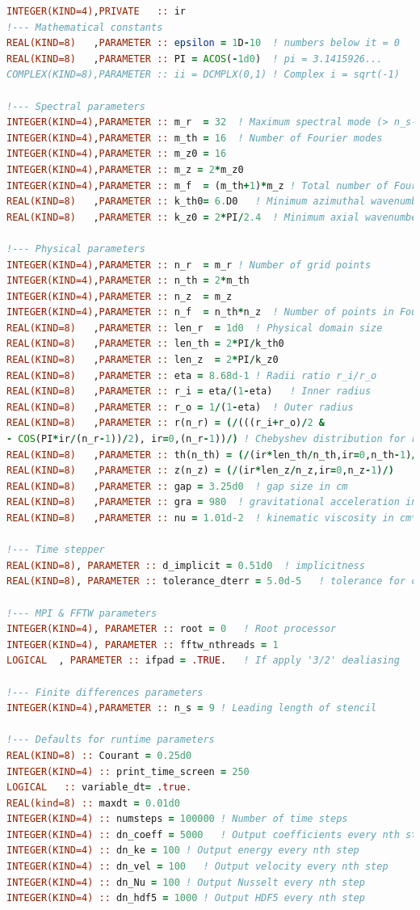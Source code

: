 \documentclass[a4paper, 11pt, DIV=11]{scrartcl}
\begin{document}
\begin{lstlisting}[language=Fortran]
INTEGER(KIND=4),PRIVATE   :: ir
!--- Mathematical constants
REAL(KIND=8)   ,PARAMETER :: epsilon = 1D-10  ! numbers below it = 0
REAL(KIND=8)   ,PARAMETER :: PI = ACOS(-1d0)  ! pi = 3.1415926...
COMPLEX(KIND=8),PARAMETER :: ii = DCMPLX(0,1) ! Complex i = sqrt(-1)

!--- Spectral parameters
INTEGER(KIND=4),PARAMETER :: m_r  = 32  ! Maximum spectral mode (> n_s-1)
INTEGER(KIND=4),PARAMETER :: m_th = 16  ! Number of Fourier modes
INTEGER(KIND=4),PARAMETER :: m_z0 = 16 
INTEGER(KIND=4),PARAMETER :: m_z = 2*m_z0 
INTEGER(KIND=4),PARAMETER :: m_f  = (m_th+1)*m_z ! Total number of Fourier modes
REAL(KIND=8)   ,PARAMETER :: k_th0= 6.D0   ! Minimum azimuthal wavenumber
REAL(KIND=8)   ,PARAMETER :: k_z0 = 2*PI/2.4  ! Minimum axial wavenumber

!--- Physical parameters
INTEGER(KIND=4),PARAMETER :: n_r  = m_r ! Number of grid points
INTEGER(KIND=4),PARAMETER :: n_th = 2*m_th
INTEGER(KIND=4),PARAMETER :: n_z  = m_z
INTEGER(KIND=4),PARAMETER :: n_f  = n_th*n_z  ! Number of points in Fourier directions
REAL(KIND=8)   ,PARAMETER :: len_r  = 1d0  ! Physical domain size
REAL(KIND=8)   ,PARAMETER :: len_th = 2*PI/k_th0
REAL(KIND=8)   ,PARAMETER :: len_z  = 2*PI/k_z0
REAL(KIND=8)   ,PARAMETER :: eta = 8.68d-1 ! Radii ratio r_i/r_o
REAL(KIND=8)   ,PARAMETER :: r_i = eta/(1-eta)   ! Inner radius
REAL(KIND=8)   ,PARAMETER :: r_o = 1/(1-eta)  ! Outer radius
REAL(KIND=8)   ,PARAMETER :: r(n_r) = (/(((r_i+r_o)/2 &
- COS(PI*ir/(n_r-1))/2), ir=0,(n_r-1))/) ! Chebyshev distribution for radial points
REAL(KIND=8)   ,PARAMETER :: th(n_th) = (/(ir*len_th/n_th,ir=0,n_th-1)/)
REAL(KIND=8)   ,PARAMETER :: z(n_z) = (/(ir*len_z/n_z,ir=0,n_z-1)/)
REAL(KIND=8)   ,PARAMETER :: gap = 3.25d0  ! gap size in cm
REAL(KIND=8)   ,PARAMETER :: gra = 980  ! gravitational acceleration in g/cm**3
REAL(KIND=8)   ,PARAMETER :: nu = 1.01d-2  ! kinematic viscosity in cm**2 /s

!--- Time stepper
REAL(KIND=8), PARAMETER :: d_implicit = 0.51d0  ! implicitness
REAL(KIND=8), PARAMETER :: tolerance_dterr = 5.0d-5   ! tolerance for corrector step

!--- MPI & FFTW parameters
INTEGER(KIND=4), PARAMETER :: root = 0   ! Root processor
INTEGER(KIND=4), PARAMETER :: fftw_nthreads = 1
LOGICAL  , PARAMETER :: ifpad = .TRUE.   ! If apply '3/2' dealiasing

!--- Finite differences parameters
INTEGER(KIND=4),PARAMETER :: n_s = 9 ! Leading length of stencil

!--- Defaults for runtime parameters
REAL(KIND=8) :: Courant = 0.25d0
INTEGER(KIND=4) :: print_time_screen = 250
LOGICAL   :: variable_dt= .true.
REAL(kind=8) :: maxdt = 0.01d0
INTEGER(KIND=4) :: numsteps = 100000 ! Number of time steps
INTEGER(KIND=4) :: dn_coeff = 5000   ! Output coefficients every nth step
INTEGER(KIND=4) :: dn_ke = 100 ! Output energy every nth step
INTEGER(KIND=4) :: dn_vel = 100   ! Output velocity every nth step
INTEGER(KIND=4) :: dn_Nu = 100 ! Output Nusselt every nth step
INTEGER(KIND=4) :: dn_hdf5 = 1000 ! Output HDF5 every nth step
\end{lstlisting}
\end{document}
